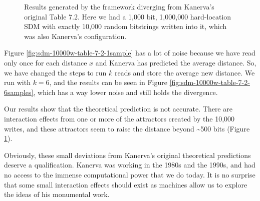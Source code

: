 \begin{figure}[h]
\centering
{}

\caption{Results generated by the framework diverging from Kanerva's original Table 7.2. Here we had a 1,000 bit, 1,000,000 hard-location SDM with exactly 10,000 random bitstrings written into it, which was also Kanerva's configuration.
\label{fig:sdm-10000w-table-7-2}}
\end{figure}

Figure \ref{fig:sdm-10000w-table-7-2-1sample} has a lot of noise because we have read only once for each distance $x$ and Kanerva has predicted the average distance. So, we have changed the steps to run $k$ reads and store the average new distance. We run with $k=6$, and the results can be seen in Figure \ref{fig:sdm-10000w-table-7-2-6samples}, which has a way lower noise and still holds the divergence.

Our results show that the theoretical prediction is not accurate.  There are interaction effects from one or more of the attractors created by the 10,000 writes, and these attractors seem to raise the distance beyond \textasciitilde 500 bits (Figure \ref{fig:sdm-10000w-table-7-2}).

Obviously, these small deviations from Kanerva's original theoretical predictions deserve a qualification.  Kanerva was working in the 1980s and the 1990s, and had no access to the immense computational power that we do today. It is no surprise that some small interaction effects should exist as machines allow us to explore the ideas of his monumental work.

